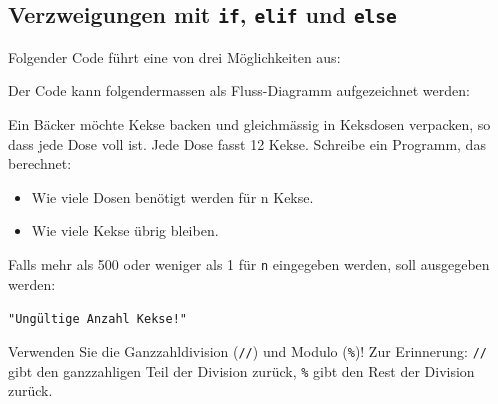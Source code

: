 \subsection{Verzweigungen mit \texorpdfstring{\lstinline|if|}{if}, \texorpdfstring{\lstinline|elif|}{elif} und \texorpdfstring{\lstinline|else|}{else}}
\begin{myexample}
Folgender Code führt eine von drei Möglichkeiten aus:


Der Code kann folgendermassen als Fluss-Diagramm aufgezeichnet werden:

\begin{figure}[H]
	\centering
	
\end{figure}
\end{myexample}

\begin{mysubmission}
	Ein Bäcker möchte Kekse backen und gleichmässig in Keksdosen verpacken, so dass jede Dose voll ist. Jede Dose fasst 12 Kekse. Schreibe ein Programm, das berechnet:

	\begin{itemize}
		\item Wie viele Dosen benötigt werden für n Kekse.
		\item Wie viele Kekse übrig bleiben.
	\end{itemize}

	Falls mehr als 500 oder weniger als 1 für \texttt{n} eingegeben werden, soll ausgegeben werden:

	\lstinline|"Ungültige Anzahl Kekse!"|

	Verwenden Sie die Ganzzahldivision (\lstinline|//|) und Modulo (\lstinline|%|)! Zur Erinnerung: \lstinline|//| gibt den ganzzahligen Teil der Division zurück, \lstinline|%| gibt den Rest der Division zurück.

	\begin{myanswer}
		
	\end{myanswer}
\end{mysubmission}

